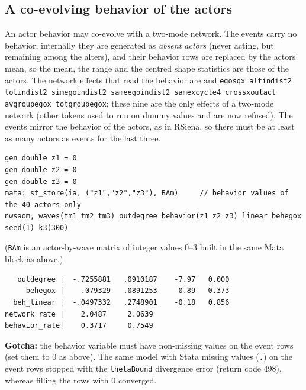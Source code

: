 \subsection{A co-evolving behavior of the actors}

An actor behavior may co-evolve with a two-mode network. The events carry no behavior; internally they are generated as \emph{absent actors} (never acting, but remaining among the alters), and their behavior rows are replaced by the actors' mean, so the mean, the range and the centred shape statistics are those of the actors. The network effects that read the behavior are  and \texttt{egosqx altindist2 totindist2 simegoindist2 sameegoindist2 samexcycle4 crossxoutact avgroupegox totgroupegox}\opt{)}; these nine are the only  effects of a two-mode network (other tokens used to run on dummy values and are now refused). The events mirror the behavior of the actors, as in RSiena, so there must be at least as many actors as events for the last three.

\begin{lstlisting}
gen double z1 = 0
gen double z2 = 0
gen double z3 = 0
mata: st_store(ia, ("z1","z2","z3"), BAm)     // behavior values of the 40 actors only
nwsaom, waves(tm1 tm2 tm3) outdegree behavior(z1 z2 z3) linear behegox seed(1) k3(300)
\end{lstlisting}
(\texttt{BAm} is an actor-by-wave matrix of integer values 0--3 built in the same Mata block as above.)
\begin{lstlisting}
   outdegree |  -.7255881   .0910187    -7.97   0.000
     behegox |    .079329   .0891253     0.89   0.373
  beh_linear |  -.0497332   .2748901    -0.18   0.856
network_rate |    2.0487     2.0639
behavior_rate|    0.3717     0.7549
\end{lstlisting}
\textbf{Gotcha:} the behavior variable must have non-missing values on the event rows (set them to 0 as above). The same model with Stata missing values (\texttt{.}) on the event rows stopped with the \texttt{thetaBound} divergence error (return code 498), whereas filling the rows with 0 converged.

